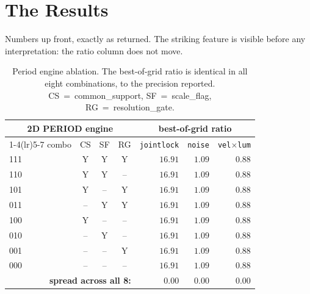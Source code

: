 \documentclass[11pt, letterpaper, openany]{book}
\begin{document}
\section{The Results}

Numbers up front, exactly as returned. The striking feature is visible before any interpretation: the
ratio column does not move.

\begin{table}[H]
\centering
\small
\begin{tabular}{@{}l ccc rrr@{}}
\toprule
\multicolumn{4}{c}{\textbf{2D PERIOD engine}} & \multicolumn{3}{c}{\textbf{best-of-grid ratio}} \\
\cmidrule(lr){1-4}\cmidrule(lr){5-7}
combo & CS & SF & RG & \texttt{jointlock} & \texttt{noise} & \texttt{vel$\times$lum} \\
\midrule
111 & Y & Y & Y & $16.91$ & $1.09$ & $0.88$ \\
110 & Y & Y & -- & $16.91$ & $1.09$ & $0.88$ \\
101 & Y & -- & Y & $16.91$ & $1.09$ & $0.88$ \\
011 & -- & Y & Y & $16.91$ & $1.09$ & $0.88$ \\
100 & Y & -- & -- & $16.91$ & $1.09$ & $0.88$ \\
010 & -- & Y & -- & $16.91$ & $1.09$ & $0.88$ \\
001 & -- & -- & Y & $16.91$ & $1.09$ & $0.88$ \\
000 & -- & -- & -- & $16.91$ & $1.09$ & $0.88$ \\
\midrule
\multicolumn{4}{r}{\textbf{spread across all 8:}} & $\mathbf{0.00}$ & $\mathbf{0.00}$ & $\mathbf{0.00}$ \\
\bottomrule
\end{tabular}
\caption{Period engine ablation. The best-of-grid ratio is identical in all eight combinations, to the
precision reported. CS~=~common\_support, SF~=~scale\_flag, RG~=~resolution\_gate.}
\end{table}
\end{document}
